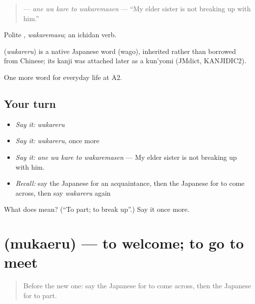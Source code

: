 \begin{quote}
\textbf{  } — \emph{ane wa kare to wakaremasen} — \textquotedblleft{}My elder sister is not breaking up with him.\textquotedblright{}
\end{quote}

Polite \textbf{}, \emph{wakaremasu}; an ichidan verb.

\begin{cousinweb}
\textbf{} (\emph{wakareru}) is a native Japanese word (wago), inherited rather than borrowed from Chinese; its kanji was attached later as a kun'yomi (JMdict, KANJIDIC2).
\end{cousinweb}

\begin{grammarlens}[title={What you've built}]
One more word for everyday life at A2.
\end{grammarlens}

\subsection*{Your turn}
\begin{itemize}
\raggedright
  \item \emph{Say it:} \emph{wakareru}
  \item \emph{Say it:} \emph{wakareru}, once more
  \item \emph{Say it:} \emph{ane wa kare to wakaremasen} — My elder sister is not breaking up with him.
  \item \emph{Recall:} say the Japanese for an acquaintance, then the Japanese for to come across, then say \emph{wakareru} again
\end{itemize}

\begin{tcolorbox}[breakable,colback=teal!4,colframe=teal!35!black,title={Before you move on}]
What does  mean? (\textquotedblleft{}To part; to break up\textquotedblright{}.) Say it once more.
\end{tcolorbox}
\section[\texorpdfstring{\ja{むかえる} (mukaeru)}{むかえる (mukaeru)}]{ (mukaeru) — to welcome; to go to meet}

\label{lesson:JA-C244-mukaeru}



\begin{quote}
Before the new one: say the Japanese for to come across, then the Japanese for to part.
\end{quote}

